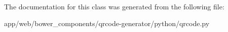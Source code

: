 The documentation for this class was generated from the following file\+:\begin{DoxyCompactItemize}
\item 
app/web/bower\+\_\+components/qrcode-\/generator/python/qrcode.\+py\end{DoxyCompactItemize}
